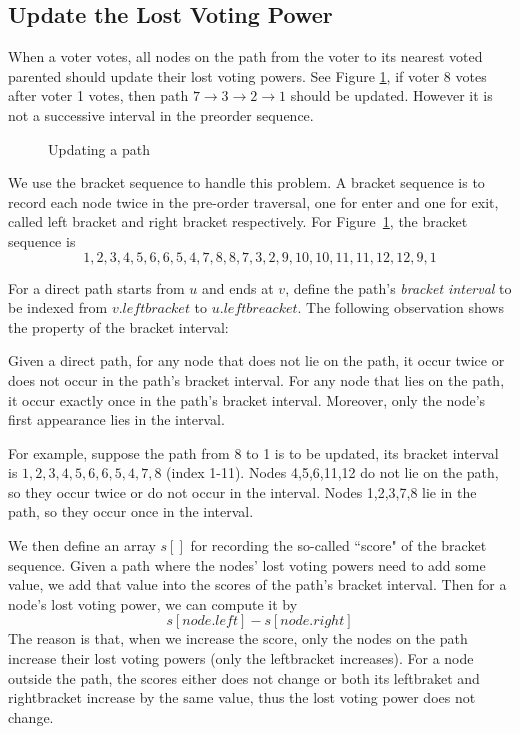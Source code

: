 \subsection{Update the Lost Voting Power}
\label{sec:step3}
When a voter votes, all nodes on the path from the voter to its nearest voted parented should update their lost voting powers. See Figure \ref{fig:2}, if voter 8 votes after voter 1 votes, then path $7\rightarrow3\rightarrow2\rightarrow1$ should be updated. However it is not a successive interval in the preorder sequence.
\begin{figure}
  \centering
  
	\caption{Updating a path}
	\label{fig:2}
\end{figure}

We use the bracket sequence to handle this problem. A bracket sequence is to
record each node twice in the pre-order traversal, one for enter and one for
exit, called left bracket and right bracket respectively. For Figure~\ref{fig:2}, the bracket sequence is
$$1,2,3,4,5,6,6,5,4,7,8,8,7,3,2,9,10,10,11,11,12,12,9,1$$

For a direct path starts from $u$ and ends at $v$, define the path's {\em bracket interval} to be indexed from $v.leftbracket$ to $u.leftbreacket$. The following observation shows the property of the bracket interval:
\begin{observation}
Given a direct path, for any node that does not lie on the path, it occur twice or does not occur in the path's bracket interval. For any node that lies on the path, it occur exactly once in the path's bracket interval. Moreover, only the node’s first appearance lies in the interval.
\end{observation}
For example, suppose the path from 8 to 1 is to be updated, its bracket interval is $1,2,3,4,5,6,6,5,4,7,8$ (index 1-11). Nodes 4,5,6,11,12 do not lie on the path, so they occur twice or do not occur in the interval. Nodes 1,2,3,7,8 lie in the path, so they occur once in the interval. 

We then define an array $s[]$ for recording the so-called ``score" of the bracket sequence. Given a path where the nodes' lost voting powers need to add some value, we add that value into the scores of the path's bracket interval. Then for a node's  lost voting power, we can compute it by
 $$s[node.left]-s[node.right]$$
 The reason is that, when we increase the score, only the nodes on the path increase their lost voting powers (only the leftbracket increases). For a node outside the path, the scores either does not change or both its leftbraket and rightbracket increase by the same value, thus the lost voting power does not change.

